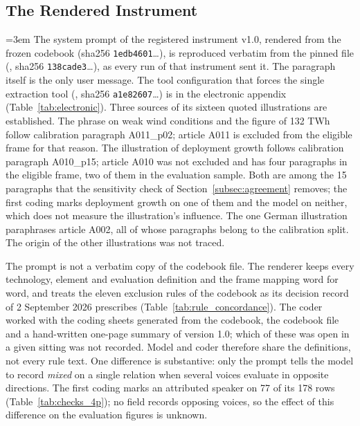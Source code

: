 \appfloatbarrier
\subsection{The Rendered Instrument}\label{app:instrument}

{\emergencystretch=3em The system prompt of the registered instrument v1.0, rendered from the frozen codebook (sha256 \texttt{1edb4601}\ldots), is reproduced verbatim from the pinned file (, sha256 \texttt{138cade3}\ldots), as every run of that instrument sent it. The paragraph itself is the only user message. The tool configuration that forces the single extraction tool (, sha256 \texttt{a1e82607}\ldots) is in the electronic appendix (Table~\ref{tab:electronic}). Three sources of its sixteen quoted illustrations are established. The phrase on weak wind conditions and the figure of 132 TWh follow calibration paragraph A011\_p02; article A011 is excluded from the eligible frame for that reason. The illustration of deployment growth follows calibration paragraph A010\_p15; article A010 was not excluded and has four paragraphs in the eligible frame, two of them in the evaluation sample. Both are among the 15 paragraphs that the sensitivity check of Section~\ref{subsec:agreement} removes; the first coding marks deployment growth on one of them and the model on neither, which does not measure the illustration's influence. The one German illustration paraphrases article A002, all of whose paragraphs belong to the calibration split. The origin of the other illustrations was not traced.\par}

The prompt is not a verbatim copy of the codebook file. The renderer keeps every technology, element and evaluation definition and the frame mapping word for word, and treats the eleven exclusion rules of the codebook as its decision record of 2 September 2026 prescribes (Table~\ref{tab:rule_concordance}). The coder worked with the coding sheets generated from the codebook, the codebook file and a hand-written one-page summary of version 1.0; which of these was open in a given sitting was not recorded. Model and coder therefore share the definitions, not every rule text. One difference is substantive: only the prompt tells the model to record \emph{mixed} on a single relation when several voices evaluate in opposite directions. The first coding marks an attributed speaker on 77 of its 178 rows (Table~\ref{tab:checks_4p}); no field records opposing voices, so the effect of this difference on the evaluation figures is unknown.

